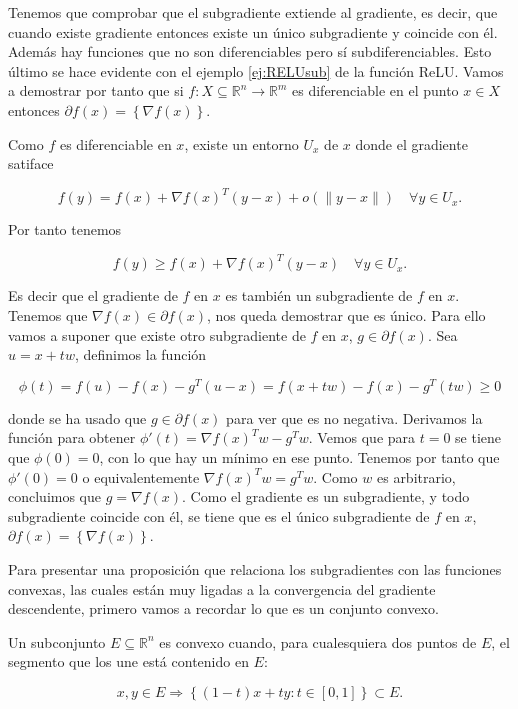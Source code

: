 Tenemos que comprobar que el subgradiente extiende al gradiente, es decir, que cuando existe gradiente entonces existe un único subgradiente y coincide con él. Además hay funciones que no son diferenciables pero sí subdiferenciables. Esto último se hace evidente con el ejemplo \ref{ej:RELUsub} de la función ReLU. Vamos a demostrar por tanto que si $f: X \subseteq \mathbb{R}^n \rightarrow \mathbb{R}^m$ es diferenciable en el punto $x\in X$ entonces  $\partial f(x)= \left \{ \nabla f(x) \right \}$.

Como $f$ es diferenciable en $x$, existe un entorno $U_x$ de $x$ donde el gradiente satiface 

$$  f(y) = f(x) + \nabla f(x)^T(y-x) + o(\|y-x \|) \quad \forall y \in U_x .$$

Por tanto tenemos

$$ f(y) \geq f(x) + \nabla f(x)^T(y-x) \quad \forall y \in U_x.$$

Es decir que el gradiente de $f$ en $x$ es también un subgradiente de $f$ en $x$. Tenemos que $\nabla f(x) \in \partial f(x)$, nos queda demostrar que es único. Para ello vamos a suponer que existe otro subgradiente de $f$ en $x$, $g \in \partial f(x)$. Sea $u=x+tw$, definimos la función

$$\phi(t)=f(u)-f(x)- g^T(u-x) = f(x+tw) -f(x) - g^T(tw) \geq 0$$

donde se ha usado que $g \in \partial f(x)$ para ver que es no negativa. Derivamos la función para obtener $\phi'(t) = \nabla f(x)^Tw - g^Tw$. Vemos que para $t=0$ se tiene que $\phi(0)=0$, con lo que hay un mínimo en ese punto. Tenemos por tanto que $\phi'(0)=0$ o equivalentemente $\nabla f(x)^Tw=g^Tw$. Como $w$ es arbitrario, concluimos que $g=\nabla f(x)$. Como el gradiente es un subgradiente, y todo subgradiente coincide con él, se tiene que es el único subgradiente de $f$ en $x$, $\partial f(x) = \left \{ \nabla f(x) \right \}$. 



Para presentar una proposición que relaciona los subgradientes con las funciones convexas, las cuales están muy ligadas a la convergencia del gradiente descendente, primero vamos a recordar lo que es un conjunto convexo.


\begin{definicion}
    Un subconjunto $E \subseteq \mathbb{R}^n$ es convexo cuando, para cualesquiera dos puntos de $E$, el segmento que los une está contenido en $E$:

    $$x,y \in E \Rightarrow \left \{ (1-t)x + ty : t\in [0,1] \right \} \subset E.$$
\end{definicion}




